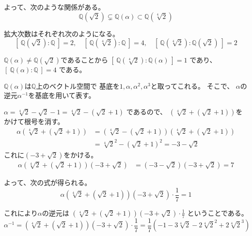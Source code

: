 \documentclass[12pt,b5paper]{ltjsarticle}
\begin{document}
\begin{enumerate}
      よって、次のような関係がある。
      \begin{equation}
       \mathbb{Q}(\sqrt{2})
        \subsetneq
        \mathbb{Q}(\alpha)
        \subset
        \mathbb{Q}(\sqrt[4]{2})
      \end{equation}

      拡大次数はそれぞれ次のようになる。
      \begin{equation}
       \left[ \: \mathbb{Q}(\sqrt{2}):\mathbb{Q} \: \right]=2
        ,\quad
        \left[ \: \mathbb{Q}(\sqrt[4]{2}):\mathbb{Q} \: \right]=4
        ,\quad
        \left[ \: \mathbb{Q}(\sqrt[4]{2}):\mathbb{Q}(\sqrt{2}) \: \right]=2
      \end{equation}

      $\mathbb{Q}(\alpha) \ne \mathbb{Q}(\sqrt{2})$であることから
      $\left[ \: \mathbb{Q}(\sqrt[4]{2}):\mathbb{Q}(\alpha) \: \right]=1$
      であり、
      $\left[ \: \mathbb{Q}(\alpha):\mathbb{Q} \: \right]=4$
      である。

      $\mathbb{Q}(\alpha)$は$\mathbb{Q}$上のベクトル空間で
      基底を$1,\alpha,\alpha^{2},\alpha^{3}$と取ってこれる。
      そこで、
      $\alpha$の逆元$\alpha^{-1}$を基底を用いて表す。

      $\alpha = \sqrt[4]{2} - \sqrt{2} -1 = \sqrt[4]{2} - (\sqrt{2} +1)$
      であるので、
      $\left( \sqrt[4]{2} + (\sqrt{2} +1) \right)$をかけて根号を消す。
      \begin{align}
       \alpha \left( \sqrt[4]{2} + (\sqrt{2} +1) \right)
       &= \left( \sqrt[4]{2} - (\sqrt{2} +1) \right)\left( \sqrt[4]{2} + (\sqrt{2} +1) \right)\\
       &= \sqrt[4]{2}^{2} - (\sqrt{2} +1)^{2}
       = - 3 - \sqrt{2}
      \end{align}
%
      これに$(- 3 + \sqrt{2})$をかける。
      \begin{align}
       \alpha \left( \sqrt[4]{2} + (\sqrt{2} +1) \right)(- 3 + \sqrt{2})
       &= (- 3 - \sqrt{2})(- 3 + \sqrt{2})
       = 7
      \end{align}

      よって、次の式が得られる。
      \begin{equation}
       \alpha \left( \sqrt[4]{2} + (\sqrt{2} +1) \right)(- 3 + \sqrt{2}) \cdot \frac{1}{7}
        =1
      \end{equation}


      これにより$\alpha$の逆元は
      $\left( \sqrt[4]{2} + (\sqrt{2} +1) \right)(- 3 + \sqrt{2}) \cdot \frac{1}{7}$
      ということである。
      \begin{equation}
       \alpha^{-1}=
       \left( \sqrt[4]{2} + (\sqrt{2} +1) \right)(- 3 + \sqrt{2}) \cdot \frac{1}{7}
        = \frac{1}{7}\left( -1 -3 \sqrt[4]{2} - 2 \sqrt[4]{2}^{2} + 2 \sqrt[4]{2}^{3}  \right)
      \end{equation}




\end{enumerate}
\end{document}
